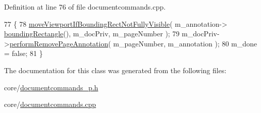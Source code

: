 Definition at line 76 of file documentcommands.\+cpp.


\begin{DoxyCode}
77 \{
78     \hyperlink{namespaceOkular_a1e0f22fec5a200bd3b1835b7bfd95172}{moveViewportIfBoundingRectNotFullyVisible}( m\_annotation->
      \hyperlink{classOkular_1_1Annotation_a450fbd08aeb31262a33a628b4ab0dd42}{boundingRectangle}(), m\_docPriv, m\_pageNumber );
79     m\_docPriv->\hyperlink{classOkular_1_1DocumentPrivate_a52fc440677b41a7717bff1cec9593d33}{performRemovePageAnnotation}( m\_pageNumber, m\_annotation );
80     m\_done = \textcolor{keyword}{false};
81 \}
\end{DoxyCode}


The documentation for this class was generated from the following files\+:\begin{DoxyCompactItemize}
\item 
core/\hyperlink{documentcommands__p_8h}{documentcommands\+\_\+p.\+h}\item 
core/\hyperlink{documentcommands_8cpp}{documentcommands.\+cpp}\end{DoxyCompactItemize}
